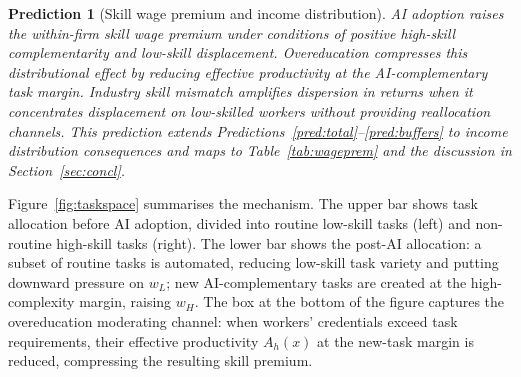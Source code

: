 \documentclass[12pt,a4paper]{article}
\theoremstyle{predstyle}
\newtheorem{prediction}{Prediction}
\theoremstyle{plain}
\begin{document}
\begin{prediction}[Skill wage premium and income distribution]
\label{pred:wage}
AI adoption raises the within-firm skill wage premium under conditions of positive high-skill complementarity and low-skill displacement. Overeducation compresses this distributional effect by reducing effective productivity at the AI-complementary task margin. Industry skill mismatch amplifies dispersion in returns when it concentrates displacement on low-skilled workers without providing reallocation channels. This prediction extends Predictions~\ref{pred:total}--\ref{pred:buffers} to income distribution consequences and maps to Table~\ref{tab:wageprem} and the discussion in Section~\ref{sec:concl}.
\end{prediction}

Figure~\ref{fig:taskspace} summarises the mechanism. The upper bar shows task allocation before AI adoption, divided into routine low-skill tasks (left) and non-routine high-skill tasks (right). The lower bar shows the post-AI allocation: a subset of routine tasks is automated, reducing low-skill task variety and putting downward pressure on $w_L$; new AI-complementary tasks are created at the high-complexity margin, raising $w_H$. The box at the bottom of the figure captures the overeducation moderating channel: when workers' credentials exceed task requirements, their effective productivity $A_h(x)$ at the new-task margin is reduced, compressing the resulting skill premium.
\end{document}
